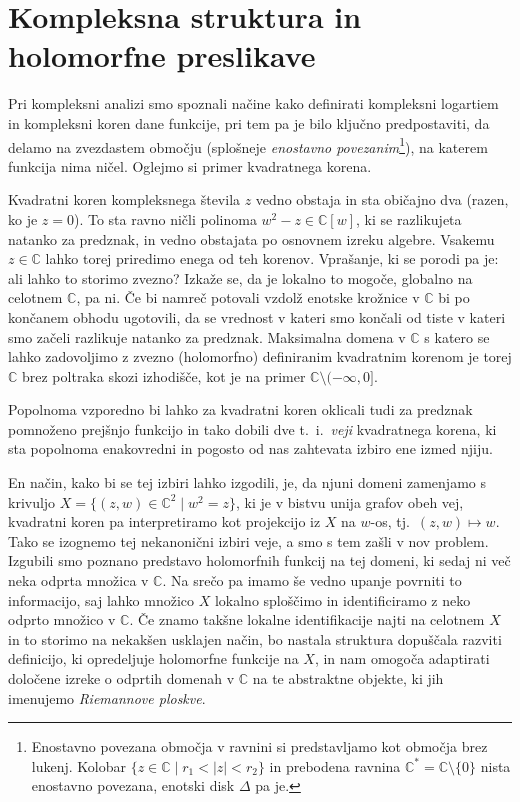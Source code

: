 \documentclass[mat1]{fmfdelo}
\numberwithin{equation}{section}
\newcommand{\C}{\mathbb C}
\newcommand{\CM}{\mathbb C ^*}
\newcommand{\abs}[1]{\left\lvert #1 \right\rvert}
\newcommand{\ti}{t.~i.\ }
\newcommand{\tj}{tj.\ }
\theoremstyle{definition}
\begin{document}
\section{Kompleksna struktura in holomorfne preslikave} \label{riemannove ploskve}
Pri kompleksni analizi smo spoznali načine kako definirati kompleksni logartiem in kompleksni koren dane funkcije, pri tem pa je bilo ključno predpostaviti, da delamo na zvezdastem območju (splošneje \emph{enostavno povezanim}\footnote{Enostavno povezana območja v ravnini si predstavljamo kot območja brez lukenj. Kolobar $\{z \in \C \mid r_1 < \abs{z} < r_2\}$ in prebodena ravnina $\CM = \C\setminus\{0\}$ nista enostavno povezana, enotski disk $\Delta$ pa je.}), na katerem funkcija nima ničel. Oglejmo si primer kvadratnega korena.

Kvadratni koren kompleksnega števila $z$ vedno obstaja in sta običajno dva (razen, ko je $z = 0$). To sta ravno ničli polinoma $w^2 - z \in \C[w]$, ki se razlikujeta natanko za predznak, in vedno obstajata po osnovnem izreku algebre. Vsakemu $z \in \C$ lahko torej priredimo enega od teh korenov. Vprašanje, ki se porodi pa je: ali lahko to storimo zvezno? Izkaže se, da je lokalno to mogoče, globalno na celotnem $\C$, pa ni. Če bi namreč potovali vzdolž enotske krožnice v $\C$ bi po končanem obhodu ugotovili, da se vrednost v kateri smo končali od tiste v kateri smo začeli razlikuje natanko za predznak. Maksimalna domena v $\C$ s katero se lahko zadovoljimo z zvezno (holomorfno) definiranim kvadratnim korenom je torej $\C$ brez poltraka skozi izhodišče, kot je na primer $\C \setminus (-\infty, 0]$.

Popolnoma vzporedno bi lahko za kvadratni koren oklicali tudi za predznak pomnoženo prejšnjo funkcijo in tako dobili dve \ti \emph{veji} kvadratnega korena, ki sta popolnoma enakovredni in pogosto od nas zahtevata izbiro ene izmed njiju. 

En način, kako bi se tej izbiri lahko izgodili, je, da njuni domeni zamenjamo s krivuljo $X = \{(z,w) \in \C^2 \mid w^2 = z\}$, ki je v bistvu unija grafov obeh vej, kvadratni koren pa interpretiramo kot projekcijo iz $X$ na $w$-os, \tj $(z,w) \mapsto w$. Tako se izognemo tej nekanonični izbiri veje, a smo s tem zašli v nov problem. Izgubili smo poznano predstavo holomorfnih funkcij na tej domeni, ki sedaj ni več neka odprta množica v $\C$. Na srečo pa imamo še vedno upanje povrniti to informacijo, saj lahko množico $X$ lokalno sploščimo in identificiramo z neko odprto množico v $\C$. Če znamo takšne lokalne identifikacije najti na celotnem $X$ in to storimo na nekakšen usklajen način, bo nastala struktura dopuščala razviti definicijo, ki opredeljuje holomorfne funkcije na $X$, in nam omogoča adaptirati določene izreke o odprtih domenah v $\C$ na te abstraktne objekte, ki jih imenujemo \emph{Riemannove ploskve}.  
\end{document}
